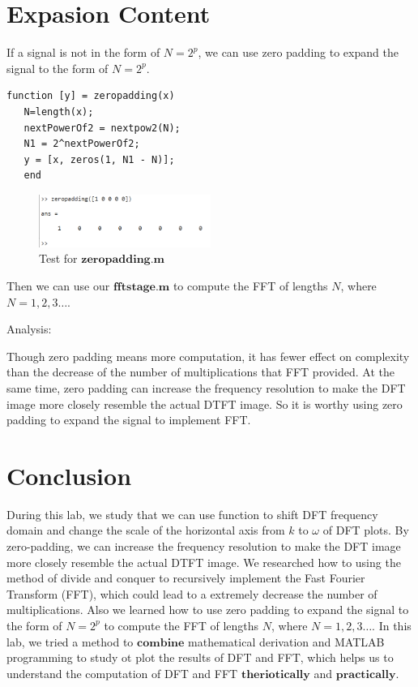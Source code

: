 \documentclass[journal]{IEEEtran}
\begin{document}
\section{Expasion Content}
If a signal is not in the form of $N = 2^p$, we can use zero padding to expand the signal to the form of $N = 2^p$.
\begin{lstlisting}[title={zeropadding.m},style=Matlab-editor]
   function [y] = zeropadding(x)
   N=length(x);
   nextPowerOf2 = nextpow2(N);  
   N1 = 2^nextPowerOf2;
   y = [x, zeros(1, N1 - N)];
   end
\end{lstlisting}
\begin{figure}[htbp]
   \centering
   \includegraphics[width=0.5\textwidth]{54.png} %
\caption{Test for $\mathbf{zeropadding.m}$}
   \label{fig:12}
 \end{figure}

Then we can use our $\mathbf{fftstage.m}$ to compute the FFT of lengths $N$, where $N=1,2,3\dots$.

\textcolor[rgb]{0,0.6,1}{Analysis:}

Though zero padding means more computation, it has fewer effect on complexity than the decrease of the number of multiplications that FFT provided. At the same time, zero padding can increase the frequency resolution to make the DFT image more closely resemble the actual DTFT image. So it is worthy using zero padding to expand the signal to implement FFT.
\section{Conclusion}
During this lab, we study that we can use function to shift DFT frequency domain and change the scale of the horizontal axis from $k$ to $\omega$ of DFT plots. By zero-padding, we can increase the frequency resolution to make the DFT image more closely resemble the actual DTFT image.
We researched how to using the method of divide and conquer to recursively implement the Fast Fourier Transform (FFT), which could lead to a extremely decrease the number of multiplications.
Also we learned how to use zero padding to expand the signal to the form of $N = 2^p$ to compute the FFT of lengths $N$, where $N=1,2,3\dots$.
In this lab, we tried a method to $\mathbf{combine}$ mathematical derivation and MATLAB programming to study ot plot the results of DFT and FFT, which helps us to understand the computation of DFT and FFT $\mathbf{theriotically}$ and $\mathbf{practically}$.
\end{document}
